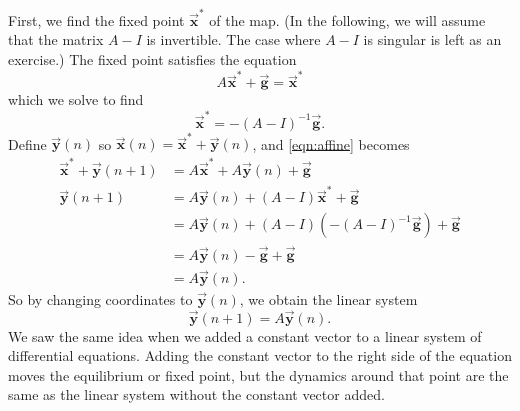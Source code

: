 \documentclass[reqno]{immbook}
\newcommand{\BG}{\vec{\textbf{g}}}
\newcommand{\BX}{\vec{\textbf{x}}}
\newcommand{\BY}{\vec{\textbf{y}}}
\numberwithin{equation}{chapter}
\numberwithin{question}{section}
\numberwithin{theorem}{chapter}
\numberwithin{figure}{chapter}
\theoremstyle{definition}
\begin{document}
First, we find the fixed point $\BX^*$ of the map.
(In the following, we will assume that 
the matrix $A-I$ is invertible.  The case
where $A-I$ is singular is left as an exercise.)
The fixed point satisfies the equation
\begin{equation}
   A\BX^* + \BG  = \BX^*
\end{equation}
which we solve to find
\begin{equation}
   \BX^*  = -(A-I)^{-1}\BG.
\end{equation}
Define $\BY(n)$ so $\BX(n) = \BX^* + \BY(n)$,
and \eqref{eqn:affine} becomes
\begin{equation}
\begin{split}
  \BX^* + \BY(n+1) & = A\BX^* + A\BY(n) +\BG \\
  \BY(n+1) & = A\BY(n) + (A-I)\BX^* + \BG \\
            & = A\BY(n) + (A-I)\left(-(A-I)^{-1}\BG\right)+\BG \\
	    & = A\BY(n) -\BG+\BG \\
	    & = A\BY(n).
\end{split}
\end{equation}
So by changing coordinates to $\BY(n)$, we obtain
the linear system
\begin{equation}
  \BY(n+1) = A\BY(n) .
\end{equation}
We saw the same idea when we added a constant vector to a
linear system of differential equations.
Adding the constant vector to the right side of the equation
moves the equilibrium or fixed point, but
the dynamics around that point are the same
as the linear system without the constant vector added.

\newpage
\end{document}
